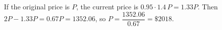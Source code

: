 If the original price is $P$, the current price is $0.95\cdot1.4\,P=1.33P$. Then $2P-1.33P=0.67P=1352.06$, so $P=\dfrac{1352.06}{0.67}=\boxed{\$2018}$.
